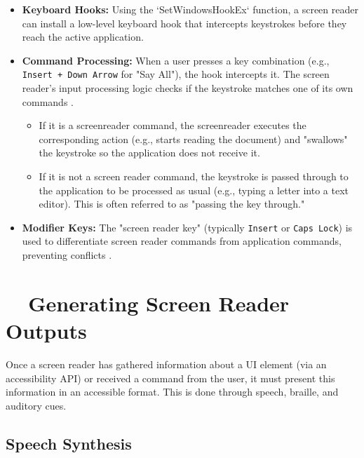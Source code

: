 \begin{itemize}
	\item \textbf{Keyboard Hooks:} Using the `SetWindowsHookEx` function, a screen reader can install a low-level keyboard hook that intercepts keystrokes before they reach the active application.
	\item \textbf{Command Processing:} When a user presses a key combination (e.g., \texttt{Insert + Down Arrow} for "Say All"), the hook intercepts it. The screen reader's input processing logic checks if the keystroke matches one of its own commands \cite{JAWSBasicCommands, NVDAKeyboardCommands, NarratorKeyboardCommands}.
	      \begin{itemize}
		      \item If it is a \gls{screenreader} command, the \gls{screenreader} executes the corresponding action (e.g., starts reading the document) and "swallows" the keystroke so the application does not receive it.
		      \item If it is not a screen reader command, the keystroke is passed through to the application to be processed as usual (e.g., typing a letter into a text editor). This is often referred to as "passing the key through."
	      \end{itemize}
	\item \textbf{Modifier Keys:} The "screen reader key" (typically \texttt{Insert} or \texttt{Caps Lock}) is used to differentiate screen reader commands from application commands, preventing conflicts \cite{WebAIMShortcuts}.
\end{itemize}

\section{~~Generating Screen Reader Outputs}
\label{sec:generating-screen-reader-outputs}

Once a screen reader has gathered information about a UI element (via an accessibility API) or received a command from the user, it must present this information in an accessible format. This is done through speech, braille, and auditory cues.

\subsection{Speech Synthesis}
\label{sub:speech-synthesis}

